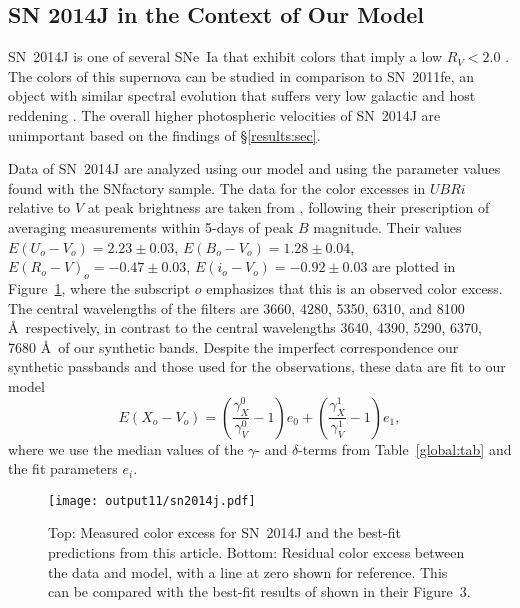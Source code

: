 \documentclass{aastex61}   	%
\begin{document}
\subsection{SN 2014J in the Context of Our Model}
\label{sn2014j:sec}
SN~2014J   is one of several SNe~Ia that exhibit colors that imply a low $R_V<2.0$ \citep{2014ApJ...788L..21A, 2014MNRAS.443.2887F, 
2014arXiv1411.3332J,
2014ApJ...795L...4K, 2015ApJ...805...74B}.
The colors of this supernova can be studied in comparison to SN~2011fe, an object with similar
spectral evolution that 
suffers very low galactic and host reddening
\citep[this technique has been used in][]{2006MNRAS.369.1880E,2007AJ....133...58K,2008MNRAS.384..107E,2010AJ....139..120F, 2014ApJ...788L..21A,
2017arXiv170101422H}.
The overall higher photospheric velocities of
SN~2014J are unimportant  based on the findings of  \S\ref{results:sec}.

Data of SN~2014J are  analyzed using our model and using the parameter values found with the SNfactory sample.
The data for the color excesses  in $UBRi$  relative to $V$ at peak brightness  are taken from \citet{2014ApJ...788L..21A},
following their prescription of averaging measurements within 5-days of peak $B$ magnitude.
Their values 
$E(U_o-V_o) =   2.23 \pm   0.03$,
$E(B_o-V_o) =   1.28 \pm   0.04$,
$E(R_o-V)_o =  -0.47 \pm   0.03$,
$E(i_o-V_o) =  -0.92 \pm   0.03$
are plotted in Figure~\ref{sn2014j:fig}, where the subscript $o$ emphasizes that this is an observed color excess.
The central wavelengths of the filters are 3660, 4280, 5350, 6310, and 8100 \AA\ respectively, in contrast to the central
wavelengths 
3640, 4390, 5290, 6370, 7680 \AA\ of our synthetic bands.  Despite the imperfect correspondence our synthetic passbands
and those used for the observations,
these data are fit to our model
\begin{equation}
E(X_o-V_o) =  \left(\frac{\gamma^0_X}{\gamma^0_V}-1\right)e_0 +  \left(\frac{\gamma^1_X}{\gamma^1_V}-1\right)e_1,
\end{equation}
where we use the median values of the $\gamma$- and $\delta$-terms from Table~\ref{global:tab} and the fit
parameters $e_i $.

\begin{figure}[htbp] %
   \centering
   \texttt{[image: output11/sn2014j.pdf]} 
   \caption{Top: Measured color excess for SN~2014J and the best-fit predictions from this article.   Bottom: Residual color excess
   between the data and model, with a line at zero shown for reference.
   This can be compared with the best-fit results of
   \citet{2014ApJ...788L..21A} shown in their Figure~3.
   \label{sn2014j:fig}}
\end{figure}
\end{document}
